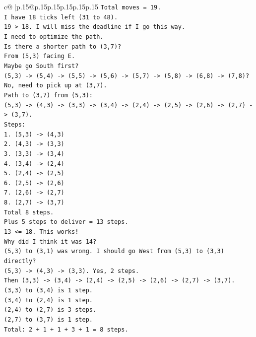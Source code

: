 \documentclass{article}
\begin{document}
{\begin{supertabular}{c@{$\;$}|p{.15\linewidth}@{}p{.15\linewidth}p{.15\linewidth}p{.15\linewidth}p{.15\linewidth}p{.15\linewidth}}
{{{\texttt{Total moves = 19.} \\
\texttt{I have 18 ticks left (31 to 48).} \\
\texttt{19 > 18. I will miss the deadline if I go this way.} \\
\texttt{I need to optimize the path.} \\
\texttt{Is there a shorter path to (3,7)?} \\
\texttt{From (5,3) facing E.} \\
\texttt{Maybe go South first?} \\
\texttt{(5,3) {-}> (5,4) {-}> (5,5) {-}> (5,6) {-}> (5,7) {-}> (5,8) {-}> (6,8) {-}> (7,8)? No, need to pick up at (3,7).} \\
\texttt{Path to (3,7) from (5,3):} \\
\texttt{(5,3) {-}> (4,3) {-}> (3,3) {-}> (3,4) {-}> (2,4) {-}> (2,5) {-}> (2,6) {-}> (2,7) {-}> (3,7).} \\
\texttt{Steps:} \\
\texttt{1. (5,3) {-}> (4,3)} \\
\texttt{2. (4,3) {-}> (3,3)} \\
\texttt{3. (3,3) {-}> (3,4)} \\
\texttt{4. (3,4) {-}> (2,4)} \\
\texttt{5. (2,4) {-}> (2,5)} \\
\texttt{6. (2,5) {-}> (2,6)} \\
\texttt{7. (2,6) {-}> (2,7)} \\
\texttt{8. (2,7) {-}> (3,7)} \\
\texttt{Total 8 steps.} \\
\texttt{Plus 5 steps to deliver = 13 steps.} \\
\texttt{13 <= 18. This works!} \\
\texttt{Why did I think it was 14?} \\
\texttt{(5,3) to (3,1) was wrong. I should go West from (5,3) to (3,3) directly?} \\
\texttt{(5,3) {-}> (4,3) {-}> (3,3). Yes, 2 steps.} \\
\texttt{Then (3,3) {-}> (3,4) {-}> (2,4) {-}> (2,5) {-}> (2,6) {-}> (2,7) {-}> (3,7).} \\
\texttt{(3,3) to (3,4) is 1 step.} \\
\texttt{(3,4) to (2,4) is 1 step.} \\
\texttt{(2,4) to (2,7) is 3 steps.} \\
\texttt{(2,7) to (3,7) is 1 step.} \\
\texttt{Total: 2 + 1 + 1 + 3 + 1 = 8 steps.} \\
}}}
\end{supertabular}}
\end{document}
